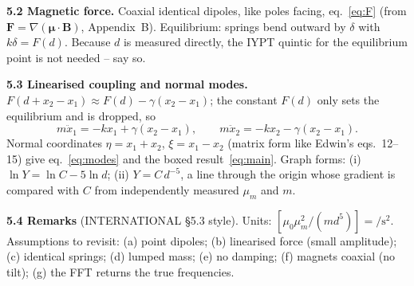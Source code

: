\documentclass[11pt,a4paper]{article}
\newcommand{\Y}{Y}                       %
\newcommand{\muz}{\mu_0}
\newcommand{\mum}{\mu_m}
\begin{document}
\textbf{5.2 Magnetic force.} Coaxial identical dipoles, like poles facing, eq.~\eqref{eq:F}
(from $\bm F=\nabla(\bm\mu\cdot\bm B)$, Appendix~B). Equilibrium: springs bend outward by
$\delta$ with $k\delta=F(d)$. Because $d$ is measured directly, the IYPT quintic for the
equilibrium point is not needed -- say so.

\textbf{5.3 Linearised coupling and normal modes.} $F(d+x_2-x_1)\approx F(d)-\gamma(x_2-x_1)$;
the constant $F(d)$ only sets the equilibrium and is dropped, so
\begin{equation}
  m\ddot x_1=-kx_1+\gamma(x_2-x_1),\qquad m\ddot x_2=-kx_2-\gamma(x_2-x_1).
  \label{eq:eom}
\end{equation}
Normal coordinates $\eta=x_1+x_2$, $\xi=x_1-x_2$ (matrix form like Edwin's eqs.~12--15) give
eq.~\eqref{eq:modes} and the boxed result~\eqref{eq:main}. Graph forms:
(i) $\ln\Y=\ln C-5\ln d$; (ii) $\Y=C\,d^{-5}$, a line through the origin whose gradient is
compared with $C$ from independently measured $\mum$ and $m$.

\textbf{5.4 Remarks} (INTERNATIONAL \S5.3 style). Units: $[\muz\mum^2/(m d^5)]=\si{\per\second\squared}$.
Assumptions to revisit: (a) point dipoles; (b) linearised force (small amplitude);
(c) identical springs; (d) lumped mass; (e) no damping; (f) magnets coaxial (no tilt);
(g) the FFT returns the true frequencies.
\end{document}

